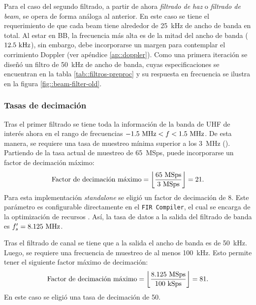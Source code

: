 \documentclass[../../main.tex]{subfiles}
\begin{document}
Para el caso del segundo filtrado, a partir de ahora \textit{filtrado de haz} o \textit{filtrado de beam}, se opera de forma análoga al anterior. En este caso se tiene el requerimiento de que cada beam tiene alrededor de 25~kHz de ancho de banda en total. Al estar en BB, la frecuencia más alta es de la mitad del ancho de banda ($12.5~\textrm{kHz}$), sin embargo, debe incorporarse un margen para contemplar el corrimiento Doppler (ver apéndice \ref{ap::doppler}). Como una primera iteración se diseñó un filtro de 50~kHz de ancho de banda, cuyas especificaciones se encuentran en la tabla \ref{tab::filtros-preproc} y su respuesta en frecuencia se ilustra en la figura \ref{fig::beam-filter-old}.


\subsubsection{Tasas de decimación}
Tras el primer filtrado se tiene toda la información de la banda de UHF de interés ahora en el rango de frecuencias $-1.5~\textrm{MHz}<f<1.5~\textrm{MHz}$. De esta manera, se requiere una tasa de muestreo mínima superior a los 3~MHz (\cite{teorema-del-muestreo}). Partiendo de la tasa actual de muestreo de 65~MSps, puede incorporarse un factor de decimación máximo:
\[\textrm{Factor de decimación máximo} = \left\lfloor\frac{65~\textrm{MSps}}{3~\textrm{MSps}}\right\rfloor = 21.\]
Para esta implementación \textit{standalone} se eligió un factor de decimación de 8. Este parámetro es configurable directamente en el \texttt{FIR Compiler}, el cual se encarga de la optimización de recursos \cite{fir-compiler}. Así, la tasa de datos a la salida del filtrado de banda es $f'_s = 8.125~\textrm{MHz}$.

Tras el filtrado de canal se tiene que a la salida el ancho de banda es de 50~kHz. Luego, se requiere una frecuencia de muestreo de al menos 100~kHz. Esto permite tener el siguiente factor máximo de decimación:
\[\textrm{Factor de decimación máximo} = \left\lfloor\frac{8.125~\textrm{MSps}}{100~\textrm{kSps}}\right\rfloor = 81.\] En este caso se eligió una tasa de decimación de 50.
\end{document}
